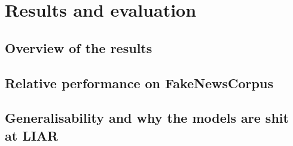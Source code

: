 \section{Results and evaluation}
\subsection{Overview of the results}

\subsection{Relative performance on FakeNewsCorpus}

\subsection{Generalisability and why the models are shit at LIAR}
